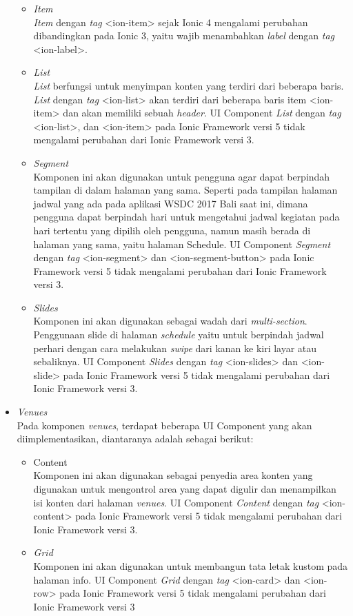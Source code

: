 \begin{itemize}
\begin{itemize}
			\item \textit{Item} \\
			\textit{Item} dengan \textit{tag} <ion-item> sejak Ionic 4 mengalami perubahan dibandingkan pada Ionic 3, yaitu wajib menambahkan \textit{label} dengan \textit{tag} <ion-label>. 
			
			\item \textit{List} \\
			\textit{List} berfungsi untuk menyimpan konten yang terdiri dari beberapa baris. \textit{List} dengan \textit{tag} <ion-list> akan terdiri dari beberapa baris item <ion-item> dan akan memiliki sebuah \textit{header}. UI Component \textit{List} dengan \textit{tag} <ion-list>, dan <ion-item> pada Ionic Framework versi 5 tidak mengalami perubahan dari Ionic Framework versi 3.	
		
			\item \textit{Segment} \\
		Komponen ini akan digunakan untuk pengguna agar dapat berpindah tampilan di dalam halaman yang sama. Seperti pada tampilan halaman jadwal yang ada pada aplikasi WSDC 2017 Bali saat ini, dimana pengguna dapat berpindah hari untuk mengetahui jadwal kegiatan pada hari tertentu yang dipilih oleh pengguna, namun masih berada di halaman yang sama, yaitu halaman Schedule. UI Component \textit{Segment} dengan \textit{tag} <ion-segment> dan <ion-segment-button> pada Ionic Framework versi 5 tidak mengalami perubahan dari Ionic Framework versi 3.
			
			\item \textit{Slides} \\
		Komponen ini akan digunakan sebagai wadah dari \textit{multi-section}. Penggunaan slide di halaman \textit{schedule} yaitu untuk berpindah jadwal perhari dengan cara melakukan \textit{swipe} dari kanan ke kiri layar atau sebaliknya. UI Component \textit{Slides} dengan \textit{tag} <ion-slides> dan <ion-slide> pada Ionic Framework versi 5 tidak mengalami perubahan dari Ionic Framework versi 3.
			
		\end{itemize}
		
	\item \textit{Venues}\\
	Pada komponen \textit{venues}, terdapat beberapa UI Component yang akan diimplementasikan, diantaranya adalah sebagai berikut:
		\begin{itemize}
			\item Content \\
		Komponen ini akan digunakan sebagai penyedia area konten yang digunakan untuk mengontrol area yang dapat digulir dan menampilkan isi konten dari halaman \textit{venues}. UI Component \textit{Content} dengan \textit{tag} <ion-content> pada Ionic Framework versi 5 tidak mengalami perubahan dari Ionic Framework versi 3.
			\item \textit{Grid} \\
		Komponen ini akan digunakan untuk membangun tata letak kustom pada halaman info. UI Component \textit{Grid} dengan \textit{tag} <ion-card> dan <ion-row> pada Ionic Framework versi 5 tidak mengalami perubahan dari Ionic Framework versi 3


\end{itemize}
\end{itemize}
